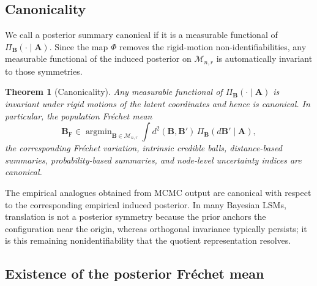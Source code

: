 \documentclass[12pt]{article}
\DeclareMathOperator*{\argmin}{argmin}
\newcommand{\calMnr}{\mathcal{M}_{n,r}}
\newcommand{\bfA}{\boldsymbol{A}}
\newcommand{\bfB}{\boldsymbol{B}}
\newcommand{\Frechet}{Fr\'{e}chet\xspace}
\newcommand{\BF}{\bfB_{\mathrm{F}}}
\newtheorem{theorem}{Theorem}
\begin{document}
\subsection{Canonicality}\label{subsec:canon}

We call a posterior summary canonical if it is a measurable functional of
$\Pi_{\bfB}(\cdot\mid \bfA)$. Since the map $\Phi$ removes the rigid-motion
non-identifiabilities, any measurable functional of the induced posterior on $\calMnr$ is
automatically invariant to those symmetries.



\begin{theorem}[Canonicality]\label{thm:canonical}
Any measurable functional of $\Pi_{\bfB}(\cdot\mid \bfA)$ is invariant under rigid motions of the
latent coordinates and hence is canonical. In particular, the population \Frechet mean
\[
\BF\in\argmin_{\bfB\in\calMnr}\int d^2(\bfB,\bfB')\,\Pi_{\bfB}(d\bfB'\mid\bfA),
\]
the corresponding \Frechet variation, intrinsic credible balls, distance-based summaries,
probability-based summaries, and node-level uncertainty indices are canonical.
\end{theorem}


The empirical analogues obtained from MCMC output are canonical with respect to the corresponding
empirical induced posterior. In many Bayesian LSMs, translation is not a posterior symmetry because
the prior anchors the configuration near the origin, whereas orthogonal invariance typically
persists; it is this remaining nonidentifiability that the quotient representation resolves.

\subsection{Existence of the posterior \Frechet mean}\label{subsec:exist}
\end{document}
